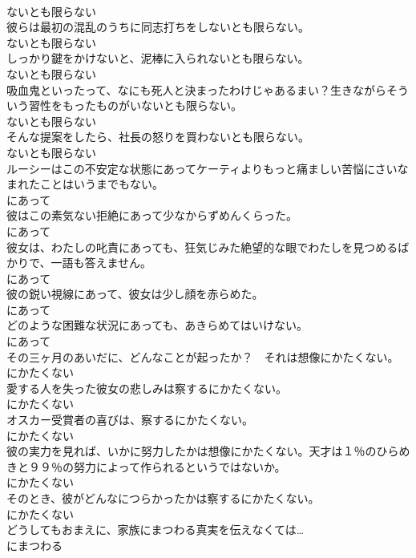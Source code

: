\documentclass[8pt]{extreport}
\begin{document}
\begin{CJK}{UTF8}{min}
\\	ないとも限らない	
\\	彼らは最初の混乱のうちに同志打ちをしないとも限らない。	
\\	ないとも限らない	
\\	しっかり鍵をかけないと、泥棒に入られないとも限らない。	
\\	ないとも限らない	
\\	吸血鬼といったって、なにも死人と決まったわけじゃあるまい？生きながらそういう習性をもったものがいないとも限らない。	
\\	ないとも限らない	
\\	そんな提案をしたら、社長の怒りを買わないとも限らない。	
\\	ないとも限らない	
\\	ルーシーはこの不安定な状態にあってケーティよりもっと痛ましい苦悩にさいなまれたことはいうまでもない。	
\\	にあって	
\\	彼はこの素気ない拒絶にあって少なからずめんくらった。	
\\	にあって	
\\	彼女は、わたしの叱責にあっても、狂気じみた絶望的な眼でわたしを見つめるばかりで、一語も答えません。	
\\	にあって	
\\	彼の鋭い視線にあって、彼女は少し顔を赤らめた。	
\\	にあって	
\\	どのような困難な状況にあっても、あきらめてはいけない。	
\\	にあって	
\\	その三ヶ月のあいだに、どんなことが起ったか？　それは想像にかたくない。	
\\	にかたくない	
\\	愛する人を失った彼女の悲しみは察するにかたくない。	
\\	にかたくない	
\\	オスカー受賞者の喜びは、察するにかたくない。	
\\	にかたくない	
\\	彼の実力を見れば、いかに努力したかは想像にかたくない。天才は１％のひらめきと９９％の努力によって作られるというではないか。	
\\	にかたくない	
\\	そのとき、彼がどんなにつらかったかは察するにかたくない。	
\\	にかたくない	
\\	どうしてもおまえに、家族にまつわる真実を伝えなくては…	
\\	にまつわる	

\end{CJK}
\end{document}
